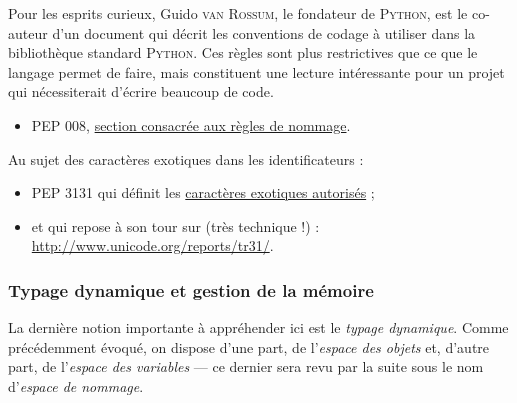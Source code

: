 \begin{gofurther}[after skip=6pt, top=4pt, bottom=6pt]
\vspace{2pt}
Pour les esprits curieux, Guido \textsc{van Rossum}, le fondateur de \textsc{Python}, est le co-auteur d'un document qui décrit les conventions de codage à utiliser dans la bibliothèque standard \textsc{Python}. Ces règles sont plus restrictives que ce que le langage permet de faire, mais constituent une lecture intéressante pour un projet qui nécessiterait d'écrire beaucoup de code.
\begin{itemize}\jazzitem
	\item PEP 008, \href{https://legacy.python.org/dev/peps/pep-0008/\#descriptive-naming-styles}{section consacrée aux règles de nommage}.
\end{itemize}

\vspace{2pt}

Au sujet des caractères exotiques dans les identificateurs :
\begin{itemize}\jazzitem
	\item PEP 3131 qui définit les \href{https://www.python.org/dev/peps/pep-3131/}{caractères exotiques autorisés} ;
	\item et qui repose à son tour sur (très technique !) :\\ 
	\url{http://www.unicode.org/reports/tr31/}.
\end{itemize}
\end{gofurther}


\subsubsection[Typage dynamique et gestion de la mémoire]{Typage dynamique et gestion de la mémoire}
\label{subsub:X.2.1.3}

La dernière notion importante à appréhender ici est le \emph{typage dynamique}. Comme précédemment évoqué, on dispose d'une part, de l'\emph{espace des objets} et, d'autre part, de l'\emph{espace des variables} --- ce dernier sera revu par la suite sous le nom d'\emph{espace de nommage}. 


